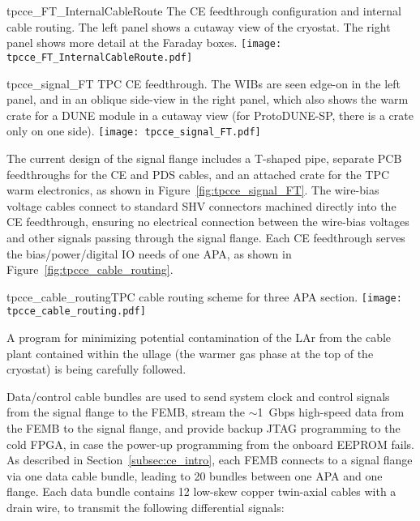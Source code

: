\begin{cdrfigure}{tpcce_FT_InternalCableRoute}{
The CE feedthrough configuration and internal cable routing. The left panel shows a cutaway view of the cryostat.
The right panel shows more detail at the Faraday boxes.}
\texttt{[image: tpcce\_FT\_InternalCableRoute.pdf]}
\end{cdrfigure}


\begin{cdrfigure}{tpcce_signal_FT}{
TPC CE feedthrough. The WIBs are seen edge-on in the left panel,
and in an oblique side-view in the right panel, which also shows the warm crate for a DUNE module in a cutaway view (for 
ProtoDUNE-SP, there is a crate only on one side).}
\texttt{[image: tpcce\_signal\_FT.pdf]}
\end{cdrfigure}

The current design of the signal flange includes a T-shaped pipe, separate PCB feedthroughs for the CE and PDS cables, and
an attached crate for the TPC warm electronics, as shown in Figure~\ref{fig:tpcce_signal_FT}.
The wire-bias voltage cables connect to standard SHV connectors machined directly into the CE feedthrough,
ensuring no electrical connection between the wire-bias voltages and other signals passing through the signal flange.
Each CE feedthrough serves the bias/power/digital IO needs of one APA, as shown 
in Figure~\ref{fig:tpcce_cable_routing}.  

\begin{cdrfigure}{tpcce_cable_routing}{TPC cable routing scheme for three APA section.}
\texttt{[image: tpcce\_cable\_routing.pdf]}
\end{cdrfigure}

A program for minimizing potential contamination of the LAr from the cable plant contained within the ullage
(the warmer gas phase at the top of the cryostat) 
is being carefully followed.


Data/control cable bundles are used to send system clock and control signals from the 
signal flange to the FEMB, stream the $\sim$1~Gbps high-speed data from the FEMB to the signal flange, and 
provide backup JTAG programming to the cold FPGA, in case the power-up programming from the onboard 
EEPROM fails. As described in Section~\ref{subsec:ce_intro}, each FEMB 
connects to a signal flange via one data cable bundle, leading to 20 bundles between one APA and one flange.
Each data bundle contains 12 low-skew copper twin-axial cables with a drain wire, 
to transmit the following differential signals:

